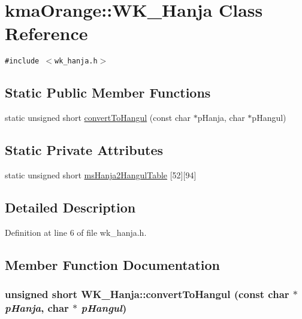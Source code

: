 \hypertarget{classkmaOrange_1_1WK__Hanja}{
\section{kmaOrange::WK\_\-Hanja Class Reference}
\label{classkmaOrange_1_1WK__Hanja}
}
{\tt \#include $<$wk\_\-hanja.h$>$}

\subsection*{Static Public Member Functions}
\begin{CompactItemize}
\item 
static unsigned short \hyperlink{classkmaOrange_1_1WK__Hanja_79480a8ae39a36f4a11e4d7872c14bef}{convertToHangul} (const char $\ast$pHanja, char $\ast$pHangul)
\end{CompactItemize}
\subsection*{Static Private Attributes}
\begin{CompactItemize}
\item 
static unsigned short \hyperlink{classkmaOrange_1_1WK__Hanja_5a812cbe0dc8d122d354b859f50635a8}{msHanja2HangulTable} \mbox{[}52\mbox{]}\mbox{[}94\mbox{]}
\end{CompactItemize}


\subsection{Detailed Description}


Definition at line 6 of file wk\_\-hanja.h.

\subsection{Member Function Documentation}
\hypertarget{classkmaOrange_1_1WK__Hanja_79480a8ae39a36f4a11e4d7872c14bef}{
\subsubsection[{convertToHangul}]{\setlength{\rightskip}{0pt plus 5cm}unsigned short WK\_\-Hanja::convertToHangul (const char $\ast$ {\em pHanja}, \/  char $\ast$ {\em pHangul})}}
\label{classkmaOrange_1_1WK__Hanja_79480a8ae39a36f4a11e4d7872c14bef}




